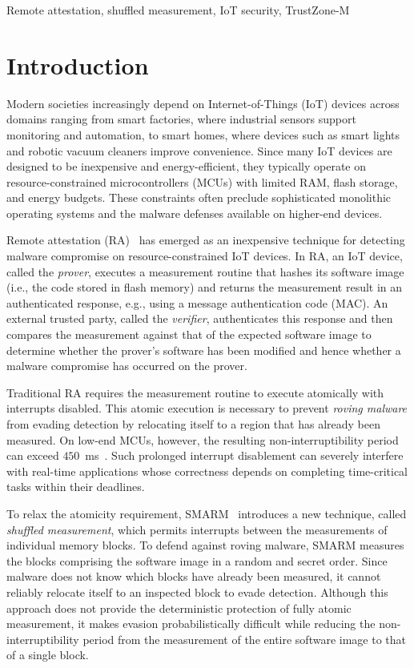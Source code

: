 \documentclass[conference]{IEEEtran}
\begin{document}
\begin{IEEEkeywords}
Remote attestation, shuffled measurement, IoT security, TrustZone-M
\end{IEEEkeywords}

\section{Introduction}
\label{sec:intro}

Modern societies increasingly depend on Internet-of-Things (IoT) devices across domains ranging from smart factories, where industrial sensors support monitoring and automation, to smart homes, where devices such as smart lights and robotic vacuum cleaners improve convenience. 
Since many IoT devices are designed to be inexpensive and energy-efficient, they typically operate on resource-constrained microcontrollers (MCUs) with limited RAM, flash storage, and energy budgets. These constraints often preclude sophisticated monolithic operating systems and the malware defenses available on higher-end devices.

Remote attestation (RA)~\cite{eldefrawy2012smart,nunes2019vrased,eldefrawy2017hydra} has emerged as an inexpensive technique for detecting malware compromise on resource-constrained IoT devices. In RA, an IoT device, called the \emph{prover}, executes a measurement routine that hashes its software image (i.e., the code stored in flash memory) and returns the measurement result in an authenticated response, e.g., using a message authentication code (MAC). 
An external trusted party, called the \emph{verifier}, authenticates this response and then compares the measurement against that of the expected software image to determine whether the prover's software has been modified and hence whether a malware compromise has occurred on the prover.

Traditional RA requires the measurement routine to execute atomically with interrupts disabled. This atomic execution is necessary to prevent \emph{roving malware} from evading detection by relocating itself to a region that has already been measured. On low-end MCUs, however, the resulting non-interruptibility period can exceed $450$~ms~\cite{nunes2019vrased}. Such prolonged interrupt disablement can severely interfere with real-time applications whose correctness depends on completing time-critical tasks within their deadlines.

To relax the atomicity requirement, SMARM~\cite{carpent2018smarm} introduces a new technique, called \emph{shuffled measurement}, which permits interrupts between the measurements of individual memory blocks. To defend against roving malware, SMARM measures the blocks comprising the software image in a random and secret order. Since malware does not know which blocks have already been measured, it cannot reliably relocate itself to an inspected block to evade detection. Although this approach does not provide the deterministic protection of fully atomic measurement, it makes evasion probabilistically difficult while reducing the non-interruptibility period from the measurement of the entire software image to that of a single block.
\end{document}
